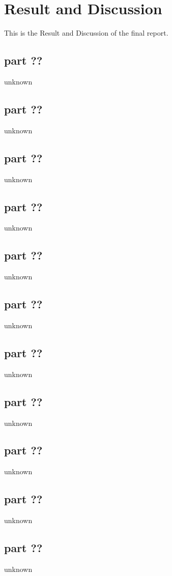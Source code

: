 \section{Result and Discussion} 
This is the Result and Discussion of the final report.
\subsection{part ??}
unknown
\subsection{part ??}
unknown
\subsection{part ??}
unknown
\subsection{part ??}
unknown
\subsection{part ??}
unknown
\subsection{part ??}
unknown
\subsection{part ??}
unknown
\subsection{part ??}
unknown
\subsection{part ??}
unknown
\subsection{part ??}
unknown
\subsection{part ??}
unknown

\newpage